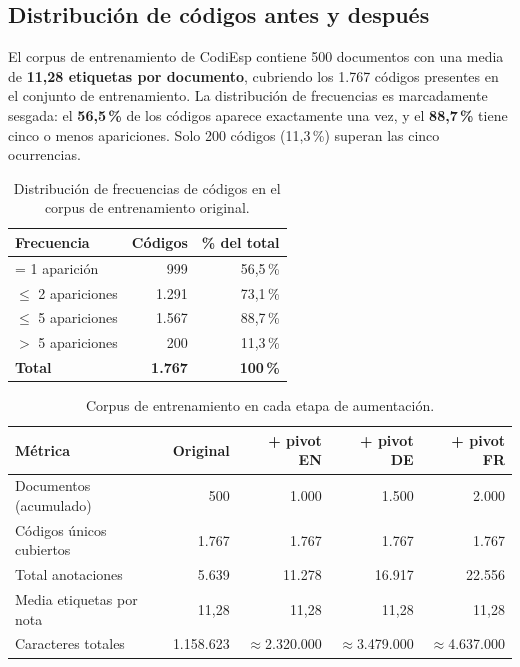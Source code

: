 \subsection{Distribución de códigos antes y después}

El corpus de entrenamiento de CodiEsp contiene 500 documentos con una media de \textbf{11,28 etiquetas por documento}, cubriendo los 1.767 códigos presentes en el conjunto de entrenamiento. La distribución de frecuencias es marcadamente sesgada: el \textbf{56,5\,\%} de los códigos aparece exactamente una vez, y el \textbf{88,7\,\%} tiene cinco o menos apariciones. Solo 200 códigos (11,3\,\%) superan las cinco ocurrencias.

\begin{table}[h]
\centering
\caption{Distribución de frecuencias de códigos en el corpus de entrenamiento original.}
\label{tab:code-dist}
\begin{tabular}{lrr}
\hline
\textbf{Frecuencia} & \textbf{Códigos} & \textbf{\% del total} \\
\hline
= 1 aparición   & 999  & 56,5\,\% \\
$\leq$ 2 apariciones & 1.291 & 73,1\,\% \\
$\leq$ 5 apariciones & 1.567 & 88,7\,\% \\
$>$ 5 apariciones   & 200  & 11,3\,\% \\
\hline
\textbf{Total}    & \textbf{1.767} & \textbf{100\,\%} \\
\hline
\end{tabular}
\end{table}

\begin{table}[h]
\centering
\caption{Corpus de entrenamiento en cada etapa de aumentación.}
\label{tab:aug-results}
\begin{tabular}{lrrrr}
\hline
\textbf{Métrica} & \textbf{Original} & \textbf{+ pivot EN} & \textbf{+ pivot DE} & \textbf{+ pivot FR} \\
\hline
Documentos (acumulado)      & 500       & 1.000   & 1.500   & 2.000   \\
Códigos únicos cubiertos    & 1.767     & 1.767   & 1.767   & 1.767   \\
Total anotaciones           & 5.639     & 11.278  & 16.917  & 22.556  \\
Media etiquetas por nota    & 11,28     & 11,28   & 11,28   & 11,28   \\
Caracteres totales          & 1.158.623 & $\approx$2.320.000 & $\approx$3.479.000 & $\approx$4.637.000 \\
\hline
\end{tabular}
\end{table}

